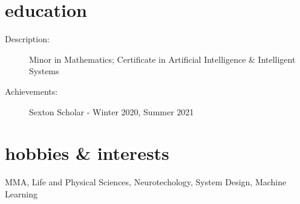 \documentclass{resume}
\begin{document}
\section*{education}
\begin{description}
  \item[Description:] Minor in Mathematics; Certificate in Artificial Intelligence \& Intelligent Systems
  \item[Achievements:] Sexton Scholar - Winter 2020, Summer 2021
\end{description}
\section*{hobbies \& interests}
MMA, Life and Physical Sciences, Neurotechology, System Design, Machine Learning
\end{document}
